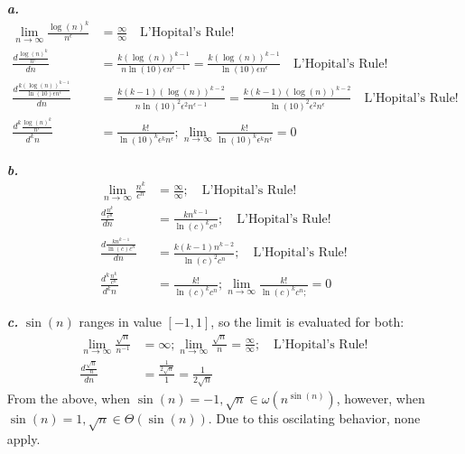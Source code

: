 \documentclass[a4paper,11pt]{article}
\theoremstyle{mytheor}
\begin{document}
\begin{itemize}
    \item[\textbf{\textit{a.}}] 
    \begin{align}
        \lim_{n\to\infty} \frac{\log(n)^k}{n^\epsilon} &= \frac{\infty}{\infty}  
            \quad \text{L'Hopital's Rule!} \\
        \frac{d\frac{\log(n)^k}{n^\epsilon}}{dn} &=         
            \frac{k(\log(n))^{k-1}}{n\ln(10)\epsilon n^{\epsilon - 1}} = 
            \frac{k(\log(n))^{k-1}}{\ln(10)\epsilon n^{\epsilon}}
            \quad \text{L'Hopital's Rule!} \\
        \frac{d\frac{k(\log(n))^{k-1}}{\ln(10)\epsilon n^{\epsilon}}}{dn} &= 
            \frac{k(k-1)(\log(n))^{k-2}}{n\ln(10)^2 \epsilon^2 n^{\epsilon-1}} =
            \frac{k(k-1)(\log(n))^{k-2}}{\ln(10)^2 \epsilon^2 n^{\epsilon}}
            \quad \text{L'Hopital's Rule!} \\
        \frac{d^k\frac{\log(n)^k}{n^\epsilon}}{d^kn} &= 
            \frac{k!}{\ln(10)^k\epsilon^kn^\epsilon}; 
            \lim_{n\to\infty}\frac{k!}{\ln(10)^k\epsilon^kn^\epsilon} = 0
    \end{align}
    
    \item[\textbf{\textit{b.}}]
    \begin{align}
        \lim_{n\to\infty}\frac{n^k}{c^n} &= \frac{\infty}{\infty}; \quad 
            \text{L'Hopital's Rule!} \\
        \frac{d\frac{n^k}{c^n}}{dn} &= \frac{kn^{k-1}}{\ln(c)^kc^n}; \quad    
            \text{L'Hopital's Rule!} \\
        \frac{d\frac{kn^{k-1}}{\ln(c)c^n}}{dn} &= \frac{k(k-1)n^{k-2}}
            {\ln(c)^2 c^n}; \quad \text{L'Hopital's Rule!} \\
        \frac{d^k\frac{n^k}{c^n}}{d^kn} &= \frac{k!}{\ln(c)^kc^n}; 
            \lim_{n\to\infty}\frac{k!}{\ln(c)^kc^n;} = 0
    \end{align}
    
    \item[\textbf{\textit{c.}}] $\sin(n)$ ranges in value $[-1, 1]$, so the limit is evaluated for both:
    \begin{align}
        \lim_{n\to\infty}\frac{\sqrt{n}}{n^{-1}} & = \infty; 
            \lim_{n\to\infty}\frac{\sqrt{n}}{n} = \frac{\infty}{\infty}; 
            \quad \text{L'Hopital's Rule!} \\
        \frac{d\frac{\sqrt{n}}{n}}{dn}& = \frac{\frac{1}{2\sqrt{n}}}{1} = 
            \frac{1}{2\sqrt{n}} 
    \end{align}
    From the above, when $\sin(n) = -1, \sqrt{n} \in \omega(n^{\sin(n)})$, 
    however, when $\sin(n) = 1, \sqrt{n} \in \Theta(\sin(n))$. Due to this 
    oscilating behavior, none apply. 
    

\end{itemize}
\end{document}
